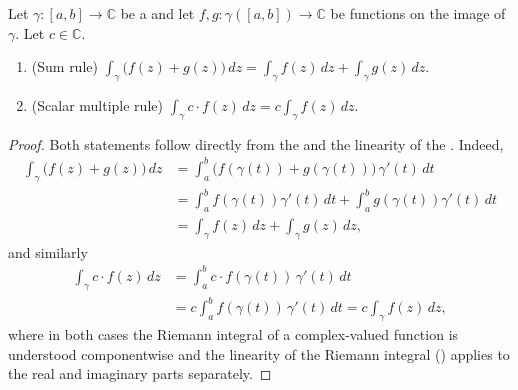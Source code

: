 \begin{proposition} \label{proposition:linearity_of_the_contour_integral_of_a_complex_valued_functions_along_a_piecewise_continuously_differentiable_path}
Let $\gamma : [a,b] \to \mathbb{C}$ be a  and let $f, g : \gamma([a,b]) \to \mathbb{C}$ be  functions on the image of $\gamma$. Let $c \in \mathbb{C}$.

\begin{enumerate}
    \item (Sum rule) $\displaystyle\int_{\gamma} \bigl(f(z) + g(z)\bigr)\,dz = \int_{\gamma} f(z)\,dz + \int_{\gamma} g(z)\,dz.$
    \item (Scalar multiple rule) $\displaystyle\int_{\gamma} c \cdot f(z)\,dz = c \int_{\gamma} f(z)\,dz.$
\end{enumerate}
\end{proposition}

\begin{proof}
    Both statements follow directly from the  and the linearity of the . Indeed,
    \begin{align*}
        \int_{\gamma} \bigl(f(z) + g(z)\bigr)\,dz &= \int_a^b \bigl(f(\gamma(t)) + g(\gamma(t))\bigr)\,\gamma'(t)\,dt \\
        &= \int_a^b f(\gamma(t))\gamma'(t)\,dt + \int_a^b g(\gamma(t))\gamma'(t)\,dt \\
        &= \int_{\gamma} f(z)\,dz + \int_{\gamma} g(z)\,dz,
    \end{align*}
    and similarly
    \begin{align*}
        \int_{\gamma} c \cdot f(z)\,dz &= \int_a^b c \cdot f(\gamma(t))\,\gamma'(t)\,dt \\
        &= c \int_a^b f(\gamma(t))\,\gamma'(t)\,dt = c \int_{\gamma} f(z)\,dz,
    \end{align*}
    where in both cases the Riemann integral of a complex-valued function is understood componentwise and the linearity of the Riemann integral () applies to the real and imaginary parts separately.
\end{proof}